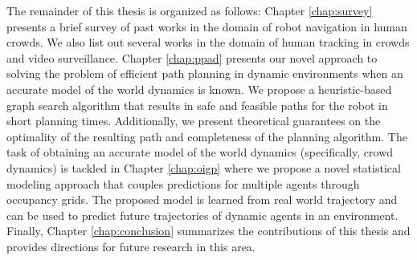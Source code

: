 The remainder of this thesis is organized as follows: Chapter \ref{chap:survey} presents a brief survey of past works in the domain of robot navigation in human crowds. We also list out several works in the domain of human tracking in crowds and video surveillance. Chapter \ref{chap:ppad} presents our novel approach to solving the problem of efficient path planning in dynamic environments when an accurate model of the world dynamics is known. We propose a heuristic-based graph search algorithm that results in safe and feasible paths for the robot in short planning times. Additionally, we present theoretical guarantees on the optimality of the resulting path and completeness of the planning algorithm. The task of obtaining an accurate model of the world dynamics (specifically, crowd dynamics) is tackled in Chapter \ref{chap:oigp} where we propose a novel statistical modeling approach that couples predictions for multiple agents through occupancy grids. The proposed model is learned from real world trajectory and can be used to predict future trajectories of dynamic agents in an environment. Finally, Chapter \ref{chap:conclusion} summarizes the contributions of this thesis and provides directions for future research in this area.

